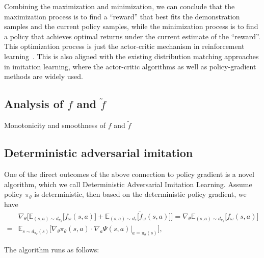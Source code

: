 Combining the maximization and minimization, 
we can conclude that the maximization process is to find a ``reward'' that best fits the demonstration samples and the current policy samples, 
while the minimization process is to find a policy that achieves optimal returns under the current estimate of the ``reward''. 
This optimization process is just the actor-critic mechanism in reinforcement learning~\citep{konda2000actor}. 
This is also aligned with the existing distribution matching approaches in imitation learning, where the actor-critic algorithms as well as policy-gradient methods are widely used.

\subsection{Analysis of $f$ and $\tilde{f}$}
Monotonicity and smoothness of $f$ and $\tilde{f}$


\subsection{Deterministic adversarial imitation}
One of the direct outcomes of the above connection to policy gradient is a novel algorithm, which we call Deterministic Adversarial Imitation Learning. 
Assume policy $\pi_{\theta}$ is deterministic, then based on the deterministic policy gradient, we have
\begin{align*}
& \nabla_{\theta} \Big[ \mathbb{E}_{(s, a)\sim d_{\pi_{\theta}}} \big[ f_{\omega}(s, a) \big] + \mathbb{E}_{(s, a)\sim d_*} \big[ \tilde{f}_{\omega}(s, a) \big] \Big] 
= \nabla_{\theta} \mathbb{E}_{(s, a)\sim d_{\pi_{\theta}}} \big[ f_{\omega}(s, a) \big] \\ 
= & \mathbb{E}_{s\sim d_{\pi_{\theta}}(s)} \big[  \nabla_\theta \pi_{\theta}(s, a) \cdot \nabla_a \Psi(s, a)\big|_{a=\pi_{\theta}(s)}\big], 
\end{align*}

The algorithm runs as follows:

